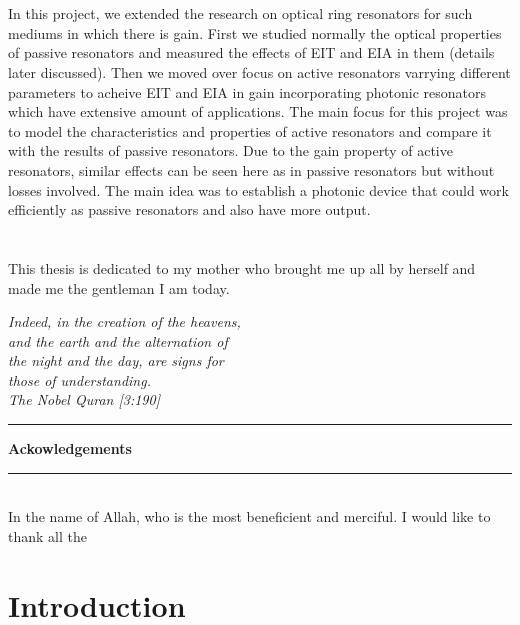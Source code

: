 \documentclass[12pt]{report}
\begin{document}
\chapter*{}
\Large In this project, we extended the research on optical ring resonators for such mediums in which there is gain. First we studied normally the optical properties of passive resonators and measured the effects of EIT and EIA in them (details later discussed). Then we moved over focus on active resonators varrying different parameters to acheive EIT and EIA in gain incorporating photonic resonators which have extensive amount of applications. The main focus for this project was to model the characteristics and properties of active resonators and compare it with the results of passive resonators. Due to the gain property of active resonators, similar effects can be seen here as in passive resonators but without losses involved. The main idea was to establish a photonic device that could work efficiently as passive resonators and also have more output.
 
\chapter*{}
\Large This thesis is dedicated to my mother who brought me up all by herself and made me the gentleman I am today.

\newpage

\begin{flushright}
\textit{\small{Indeed, in the creation of the heavens,\\ and the earth and the alternation of\\ the night and the day, are signs for\\ those of understanding.\\ The Nobel Quran [3:190]}}
\end{flushright}
\noindent\rule{15cm}{1pt}
\begin{flushleft}
\textbf{\Large{Ackowledgements}}
\end{flushleft}
\noindent\rule{15cm}{1pt} \\
\small In the name of Allah, who is the most beneficient and merciful. I would like to thank all the 


\tableofcontents
\listoffigures
\newpage
{}

\chapter{Introduction}

 
\end{document}

